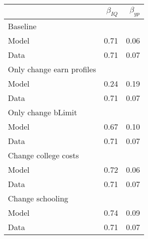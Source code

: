 \begin{tabular}{lrr}
\hline
  & $\beta_{IQ}$  & $\beta_{yp}$  \\ 
\hline
Baseline &   &   \\ 
Model & 0.71  & 0.06  \\ 
Data & 0.71  & 0.07  \\ 
Only change earn profiles &   &   \\ 
Model & 0.24  & 0.19  \\ 
Data & 0.71  & 0.07  \\ 
Only change bLimit &   &   \\ 
Model & 0.67  & 0.10  \\ 
Data & 0.71  & 0.07  \\ 
Change college costs &   &   \\ 
Model & 0.72  & 0.06  \\ 
Data & 0.71  & 0.07  \\ 
Change schooling &   &   \\ 
Model & 0.74  & 0.09  \\ 
Data & 0.71  & 0.07  \\ 
\hline
\end{tabular}%
